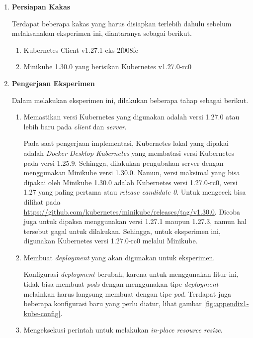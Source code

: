\begin{enumerate}
    \item \textbf{Persiapan Kakas}

        Terdapat beberapa kakas yang harus disiapkan terlebih dahulu sebelum melaksanakan eksperimen ini, diantaranya sebagai berikut.

        \begin{enumerate}
            \item Kubernetes Client v1.27.1-eks-2f008fe
            \item Minikube 1.30.0 yang berisikan Kubernetes v1.27.0-rc0
        \end{enumerate}

    \item \textbf{Pengerjaan Eksperimen}
        
        Dalam melakukan eksperimen ini, dilakukan beberapa tahap sebagai berikut.

        \begin{enumerate}
            \item Memastikan versi Kubernetes yang digunakan adalah versi 1.27.0 atau lebih baru pada \textit{client} dan \textit{server}.
            
            Pada saat pengerjaan implementasi, Kubernetes lokal yang dipakai adalah \textit{Docker Desktop Kubernetes} yang membatasi versi Kubernetes pada versi 1.25.9. Sehingga, dilakukan pengubahan server dengan menggunakan Minikube versi 1.30.0. Namun, versi maksimal yang bisa dipakai oleh Minikube 1.30.0 adalah Kubernetes versi 1.27.0-rc0, versi 1.27 yang paling pertama atau \textit{release candidate 0}. Untuk mengecek bisa dilihat pada \url{https://github.com/kubernetes/minikube/releases/tag/v1.30.0}. Dicoba juga untuk dipaksa menggunakan versi 1.27.1 maupun 1.27.3, namun hal tersebut gagal untuk dilakukan. Sehingga, untuk eksperimen ini, digunakan Kubernetes versi 1.27.0-rc0 melalui Minikube.

            \item Membuat \textit{deployment} yang akan digunakan untuk eksperimen.
            
            Konfigurasi \textit{deployment} berubah, karena untuk menggunakan fitur ini, tidak bisa membuat \textit{pods} dengan menggunakan tipe \textit{deployment} melainkan harus langsung membuat dengan tipe \textit{pod}. Terdapat juga beberapa konfigurasi baru yang perlu diatur, lihat gambar \ref{fig:appendix1-kube-config}.

            \item Mengeksekusi perintah untuk melakukan \textit{in-place resource resize}.
            

\end{enumerate}
\end{enumerate}
